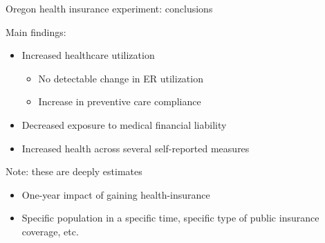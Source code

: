 \begin{frame}{Oregon health insurance experiment: conclusions}
    
        Main findings: 
        \begin{itemize}
            \item Increased healthcare utilization
            \begin{itemize}
                \item No detectable change in ER utilization
                \item Increase in preventive care compliance
            \end{itemize}
            \item Decreased exposure to medical financial liability
            \item Increased health across several self-reported measures
        \end{itemize}
        \vspace{3mm}
    
        Note: these are deeply  estimates
        \begin{itemize}
            \item One-year impact of gaining health-insurance
            \item Specific population in a specific time, specific type of public insurance coverage, etc.
        \end{itemize}
        
\end{frame}
